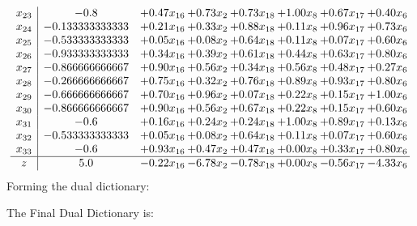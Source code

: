 \documentclass[8pt]{article}
\begin{document}
\[\begin{array}{c| c c@{\hskip 2pt} c@{\hskip 2pt} c@{\hskip 2pt} c@{\hskip 2pt} c@{\hskip 2pt} c@{\hskip 2pt} }
 x_{23}   &  -0.8 & +  0.47 x_{16} & +  0.73 x_{2} & +  0.73 x_{18} & +  1.00 x_{8} & +  0.67 x_{17} & +  0.40 x_{6}\\
 x_{24}   &  -0.133333333333 & +  0.21 x_{16} & +  0.33 x_{2} & +  0.88 x_{18} & +  0.11 x_{8} & +  0.96 x_{17} & +  0.73 x_{6}\\
 x_{25}   &  -0.533333333333 & +  0.05 x_{16} & +  0.08 x_{2} & +  0.64 x_{18} & +  0.11 x_{8} & +  0.07 x_{17} & +  0.60 x_{6}\\
 x_{26}   &  -0.933333333333 & +  0.34 x_{16} & +  0.39 x_{2} & +  0.61 x_{18} & +  0.44 x_{8} & +  0.63 x_{17} & +  0.80 x_{6}\\
 x_{27}   &  -0.866666666667 & +  0.90 x_{16} & +  0.56 x_{2} & +  0.34 x_{18} & +  0.56 x_{8} & +  0.48 x_{17} & +  0.27 x_{6}\\
 x_{28}   &  -0.266666666667 & +  0.75 x_{16} & +  0.32 x_{2} & +  0.76 x_{18} & +  0.89 x_{8} & +  0.93 x_{17} & +  0.80 x_{6}\\
 x_{29}   &  -0.666666666667 & +  0.70 x_{16} & +  0.96 x_{2} & +  0.07 x_{18} & +  0.22 x_{8} & +  0.15 x_{17} & +  1.00 x_{6}\\
 x_{30}   &  -0.866666666667 & +  0.90 x_{16} & +  0.56 x_{2} & +  0.67 x_{18} & +  0.22 x_{8} & +  0.15 x_{17} & +  0.60 x_{6}\\
 x_{31}   &  -0.6 & +  0.16 x_{16} & +  0.24 x_{2} & +  0.24 x_{18} & +  1.00 x_{8} & +  0.89 x_{17} & +  0.13 x_{6}\\
 x_{32}   &  -0.533333333333 & +  0.05 x_{16} & +  0.08 x_{2} & +  0.64 x_{18} & +  0.11 x_{8} & +  0.07 x_{17} & +  0.60 x_{6}\\
 x_{33}   &  -0.6 & +  0.93 x_{16} & +  0.47 x_{2} & +  0.47 x_{18} & +  0.00 x_{8} & +  0.33 x_{17} & +  0.80 x_{6}\\
\hline
z    &  5.0 & -0.22 x_{16} & -6.78 x_{2} & -0.78 x_{18} & +  0.00 x_{8} & -0.56 x_{17} & -4.33 x_{6}\\
\end{array}\]
Forming the dual dictionary:

The Final Dual Dictionary is: 
\end{document}
